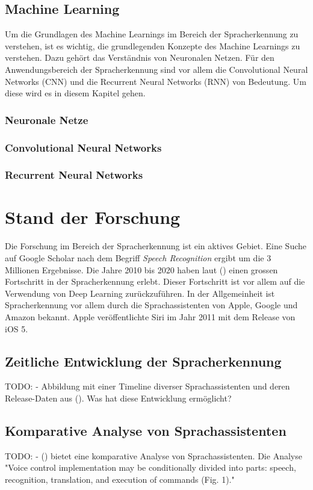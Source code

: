 \documentclass[11pt,a4paper]{article}
\begin{document}
\subsection{Machine Learning}
Um die Grundlagen des Machine Learnings im Bereich der Spracherkennung zu verstehen, ist es 
wichtig, die grundlegenden Konzepte des Machine Learnings zu verstehen. Dazu gehört das Verständnis
von Neuronalen Netzen. Für den Anwendungsbereich der Spracherkennung sind vor allem die 
Convolutional Neural Networks (CNN) und die Recurrent Neural Networks (RNN) von Bedeutung. Um diese
wird es in diesem Kapitel gehen.

\subsubsection{Neuronale Netze}

\subsubsection{Convolutional Neural Networks}

\subsubsection{Recurrent Neural Networks}


\newpage \section{Stand der Forschung}
Die Forschung im Bereich der Spracherkennung ist ein aktives Gebiet. Eine Suche auf Google Scholar
nach dem Begriff \textit{Speech Recognition} ergibt um die 3 Millionen Ergebnisse. Die Jahre 2010
bis 2020 haben laut (\cite{hannun2021history}) einen grossen Fortschritt in der Spracherkennung
erlebt. Dieser Fortschritt ist vor allem auf die Verwendung von Deep Learning zurückzuführen. In
der Allgemeinheit ist Spracherkennung vor allem durch die Sprachassistenten von Apple, Google und
Amazon bekannt. Apple veröffentlichte Siri im Jahr 2011 mit dem Release von iOS 5. 

\subsection{Zeitliche Entwicklung der Spracherkennung} 
TODO: - Abbildung mit einer Timeline diverser Sprachassistenten und deren Release-Daten aus 
(\cite{hannun2021history}). Was hat diese Entwicklung ermöglicht?

\subsection{Komparative Analyse von Sprachassistenten}
TODO: - (\cite{matarneh2017speechrecognition}) bietet eine komparative Analyse von 
Sprachassistenten. Die Analyse "Voice control implementation may be conditionally divided into 
parts: speech, recognition, translation, and execution of commands (Fig. 1)."
\end{document}
